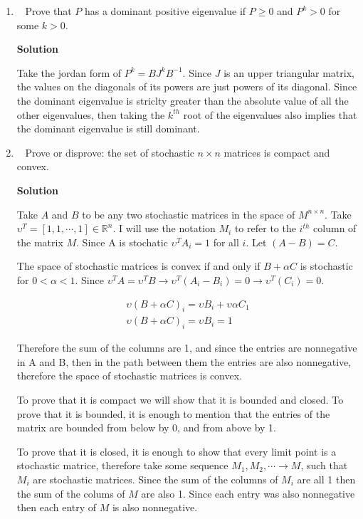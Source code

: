 \documentclass[11pt]{article}
\newcommand\red[1]{\marginpar{\linespread{.85}\sf%
		   \vspace{-1.4ex}\footnotesize{\color{red}#1}}}
\newcommand\score[1]{\marginpar{\vspace{-2ex}\color{blue}{#1/3}}\hspace{-1ex}}
\newcommand\0{\mathbf{0}}
\newcommand\RR{\mathbb{R}}
\newcommand\<{\langle}
\renewcommand\>{\rangle}
\begin{document}
\begin{enumerate}
\item\ \score{3}%
Prove that $P$ has a dominant positive eigenvalue if $P \geq 0$ and
$P^k > 0$ for some $k > 0$. \red{Slick}

\textbf{Solution}

Take the jordan form of $P^{k}=BJ^{k}B^{-1}$. Since $J$ is an upper triangular matrix, 
the values on the diagonals of its powers are just powers of its diagonal. Since the
dominant eigenvalue is striclty greater than the absolute value of all the other eigenvalues, then taking 
the $k^{th}$ root of the eigenvalues also implies that the dominant eigenvalue is still dominant. 

\item\ \score{3}%
Prove or disprove: the set of stochastic $n \times n$ matrices is
compact and convex.

\textbf{Solution}

Take $A$ and $B$ to be any two stochastic matrices in the space of $M^{n\times n}$.
Take $\upsilon^{T} = [1,1,\cdots , 1] \in \RR^{n}$. I will use the notation $M_{i}$ to 
refer to the $i^{th}$ column of the matrix $M$. Since A is stochatic $\upsilon^{T}A_{i}=1$ for all $i$. Let $(A-B)=C$.

The space of stochastic matrices is convex if and only if $B+\alpha C$ is stochastic 
for $0 < \alpha < 1$. Since $\upsilon^{T} A = \upsilon^{T} B \rightarrow \upsilon^{T}(A_{i}-B_{i})=0 \rightarrow \upsilon^{T}(C_{i})=0$.

\begin{align*}
  \upsilon(B+\alpha C)_{i}=\upsilon B_{i}+\upsilon \alpha C_{1}\\
  \upsilon(B+\alpha C)_{i}=\upsilon B_{i}=1
\end{align*}

Therefore the sum of the columns are 1, and since the entries are nonnegative in A and B, then
in the path between them the entries are also nonnegative, therefore the space of stochastic matrices
is convex. 

To prove that it is compact we will show that it is bounded and closed. To prove that it 
is bounded, it is enough to mention that the entries of the matrix are bounded 
from below by 0, and from above by 1.

To prove that it is closed, it is enough to show that every limit point is a stochastic matrice, therefore take some sequence 
$M_{1},M_{2}, \cdots \rightarrow M$, such that $M_{i}$ are stochastic matrices.
Since the sum of the columns of $M_{i}$ are all 1 then the sum of the colums of $M$ are also 1. 
Since each entry was also nonnegative then each entry of $M$ is also nonnegative.


\end{enumerate}
\end{document}
